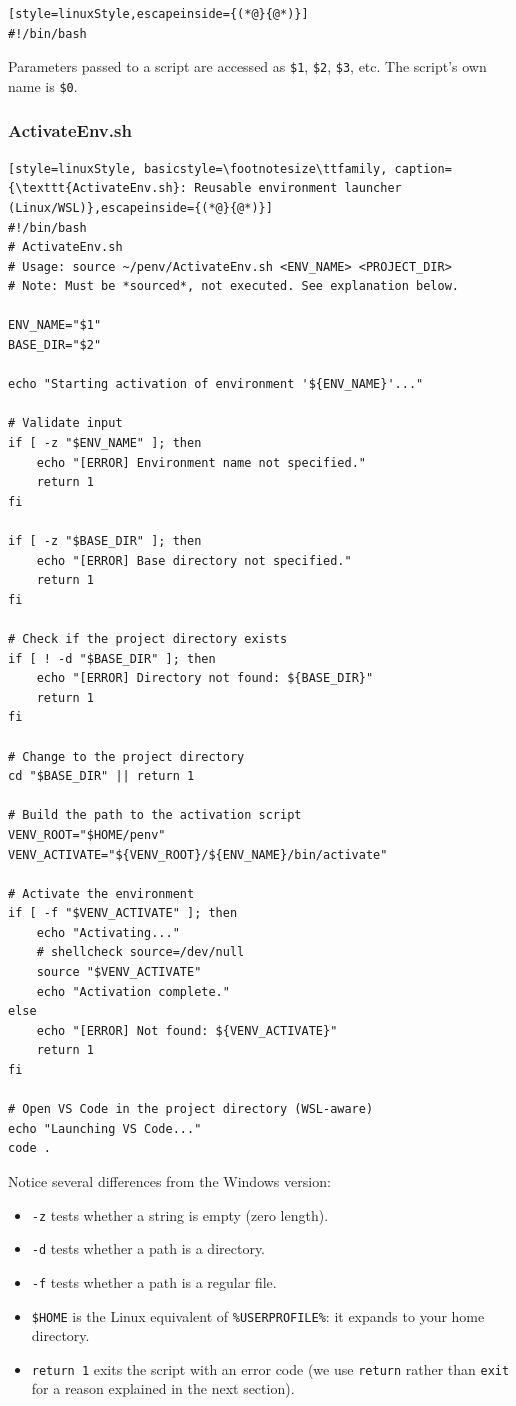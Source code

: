\begin{lstlisting}[style=linuxStyle,escapeinside={(*@}{@*)}]
#!/bin/bash
\end{lstlisting}

Parameters passed to a script are accessed as \texttt{\$1}, \texttt{\$2},
\texttt{\$3}, etc. The script's own name is \texttt{\$0}.

\subsubsection{ActivateEnv.sh}

\begin{lstlisting}[style=linuxStyle, basicstyle=\footnotesize\ttfamily, caption={\texttt{ActivateEnv.sh}: Reusable environment launcher (Linux/WSL)},escapeinside={(*@}{@*)}]
#!/bin/bash
# ActivateEnv.sh
# Usage: source ~/penv/ActivateEnv.sh <ENV_NAME> <PROJECT_DIR>
# Note: Must be *sourced*, not executed. See explanation below.

ENV_NAME="$1"
BASE_DIR="$2"

echo "Starting activation of environment '${ENV_NAME}'..."

# Validate input
if [ -z "$ENV_NAME" ]; then
    echo "[ERROR] Environment name not specified."
    return 1
fi

if [ -z "$BASE_DIR" ]; then
    echo "[ERROR] Base directory not specified."
    return 1
fi

# Check if the project directory exists
if [ ! -d "$BASE_DIR" ]; then
    echo "[ERROR] Directory not found: ${BASE_DIR}"
    return 1
fi

# Change to the project directory
cd "$BASE_DIR" || return 1

# Build the path to the activation script
VENV_ROOT="$HOME/penv"
VENV_ACTIVATE="${VENV_ROOT}/${ENV_NAME}/bin/activate"

# Activate the environment
if [ -f "$VENV_ACTIVATE" ]; then
    echo "Activating..."
    # shellcheck source=/dev/null
    source "$VENV_ACTIVATE"
    echo "Activation complete."
else
    echo "[ERROR] Not found: ${VENV_ACTIVATE}"
    return 1
fi

# Open VS Code in the project directory (WSL-aware)
echo "Launching VS Code..."
code .
\end{lstlisting}

Notice several differences from the Windows version:
\begin{itemize}
  \item \texttt{-z} tests whether a string is empty (zero length).
  \item \texttt{-d} tests whether a path is a directory.
  \item \texttt{-f} tests whether a path is a regular file.
  \item \texttt{\$HOME} is the Linux equivalent of
        \texttt{\%USERPROFILE\%}: it expands to your home directory.
  \item \texttt{return 1} exits the script with an error code (we use
        \texttt{return} rather than \texttt{exit} for a reason explained in
        the next section).
\end{itemize}

